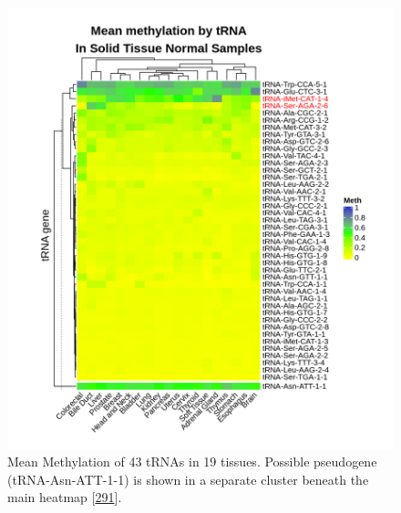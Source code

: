 \documentclass[
]{book}
\begin{document}
\begin{figure}

{\centering \includegraphics[width=0.9\linewidth]{./figs/meanBetasByTissueTNMpseudoSplitHeatmap} 

}

\caption{Mean Methylation of 43 tRNAs in 19 tissues. Possible pseudogene (tRNA-Asn-ATT-1-1) is shown in a separate cluster beneath the main heatmap {[}\protect\hyperlink{ref-Gu2016}{291}{]}.}\label{fig:meanBetasByTissueTNMHeatmap}
\end{figure}
\end{document}
